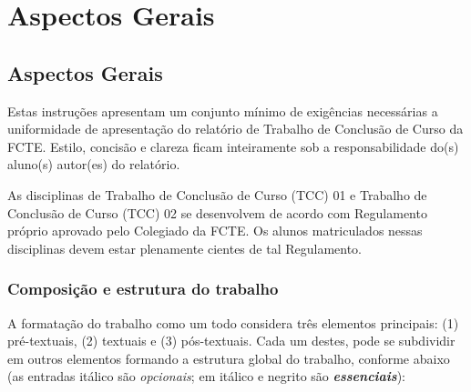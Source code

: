 \part{Aspectos Gerais}

\chapter[Aspectos Gerais]{Aspectos Gerais}

Estas instruções apresentam um conjunto mínimo de exigências necessárias a 
uniformidade de apresentação do relatório de Trabalho de Conclusão de Curso 
da FCTE. Estilo, concisão e clareza ficam inteiramente sob a 
responsabilidade do(s) aluno(s) autor(es) do relatório.

As disciplinas de Trabalho de Conclusão de Curso (TCC) 01 e Trabalho de 
Conclusão de Curso (TCC) 02 se desenvolvem de acordo com Regulamento 
próprio aprovado pelo Colegiado da FCTE. Os alunos matriculados nessas 
disciplinas devem estar plenamente cientes de tal Regulamento. 

\section{Composição e estrutura do trabalho}

A formatação do trabalho como um todo considera três elementos principais: 
(1) pré-textuais, (2) textuais e (3) pós-textuais. Cada um destes, pode se 
subdividir em outros elementos formando a estrutura global do trabalho, 
conforme abaixo (as entradas itálico são \textit{opcionais}; em itálico e
negrito são \textbf{\textit{essenciais}}):

